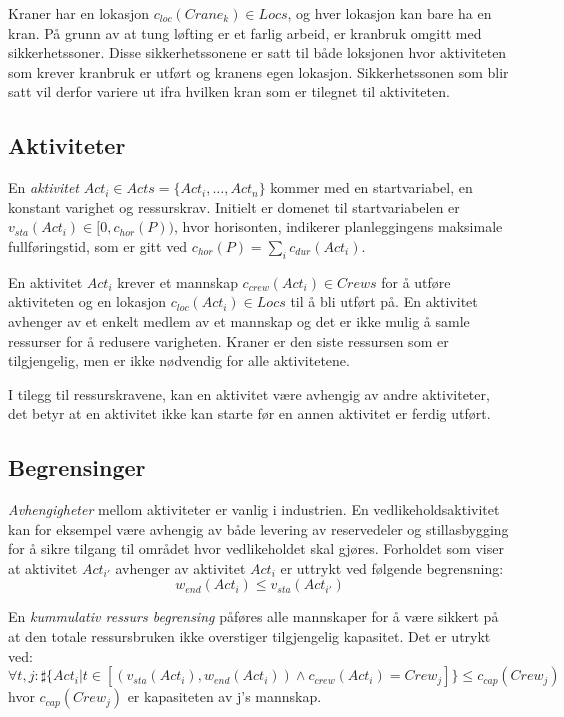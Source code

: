 Kraner har en lokasjon $ c_{loc}(Crane_{k}) \in Locs $, og hver lokasjon kan bare ha en kran. På grunn av at tung løfting er et farlig arbeid, er kranbruk omgitt med sikkerhetssoner. Disse sikkerhetssonene er satt til både loksjonen hvor aktiviteten som krever kranbruk er utført og kranens egen lokasjon. Sikkerhetssonen som blir satt vil derfor variere ut ifra hvilken kran som er tilegnet til aktiviteten.

\subsection{Aktiviteter}
En \textit{aktivitet} $ Act_{i} \in Acts = \{ Act_{i},\dots,Act_{n} \} $ kommer med en startvariabel, en konstant varighet og ressurskrav. Initielt er domenet til startvariabelen er $ v_{sta}(Act_{i}) \in [ 0, c_{hor}(P)) $, hvor horisonten, indikerer planleggingens maksimale fullføringstid, som er gitt ved $ c_{hor}(P) = \sum_{i} c_{dur}(Act_{i}) $.

En aktivitet $ Act_{i} $ krever et mannskap $ c_{crew}(Act_{i}) \in Crews $ for å utføre aktiviteten og en lokasjon $ c_{loc}(Act_{i}) \in Locs $ til å bli utført på. En aktivitet avhenger av et enkelt medlem av et mannskap og det er ikke mulig å samle ressurser for å redusere varigheten. Kraner er den siste ressursen som er tilgjengelig, men er ikke nødvendig for alle aktivitetene.

I tilegg til ressurskravene, kan en aktivitet være avhengig av andre aktiviteter, det betyr at en aktivitet ikke kan starte før en annen aktivitet er ferdig utført.

\subsection{Begrensinger}
\textit{Avhengigheter} mellom aktiviteter er vanlig i industrien. En vedlikeholdsaktivitet kan for eksempel være avhengig av både levering av reservedeler og stillasbygging for å sikre tilgang til området hvor vedlikeholdet skal gjøres. Forholdet som viser at aktivitet $ Act_{i'} $ avhenger av aktivitet $ Act_{i} $ er uttrykt ved følgende begrensning: 
\begin{equation}
w_{end}(Act_{i}) \leq v_{sta}(Act_{i'})
\end{equation}

En \textit{kummulativ ressurs begrensing} påføres alle mannskaper for å være sikkert på at den totale ressursbruken ikke overstiger tilgjengelig kapasitet. Det er utrykt ved: 
\begin{equation}
\forall t,j : \sharp \{ Act_{i} | t \in [(v_{sta}(Act_{i}), w_{end}(Act_{i})) \wedge c_{crew}(Act_{i}) = Crew_{j}] \} \leq c_{cap}(Crew_{j})
\end{equation}
hvor $ c_{cap}(Crew_{j}) $ er kapasiteten av j's mannskap.

